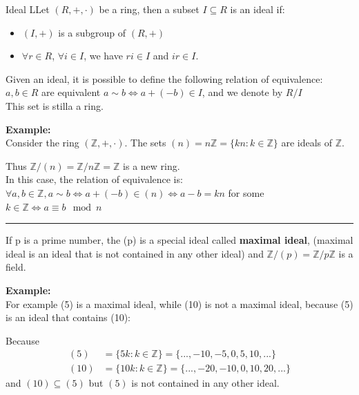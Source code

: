 \bigskip

\begin{defBox}{Ideal}
    LLet $(R, +, \cdot)$ be a ring, then a subset $I \subseteq R$ is an ideal if:
    \begin{itemize} 
        \item $(I, +)$ is a subgroup of $(R, +)$
        \item $\forall r \in R$, $\forall i \in I$, we have $ri \in I$ and $ir \in I$.
    \end{itemize}
\end{defBox}

\noindent
Given an ideal, it is possible to define the following relation of equivalence: $a, b \in R$ are equivalent $a \sim b \iff a + (-b) \in I$, and we denote by $R/I$\\
This set is stilla a ring.
\medskip

\noindent
\textbf{Example:}\\
Consider the ring $(\mathbb{Z}, +, \cdot)$. The sets $(n)= n\mathbb{Z} = \{ kn: k \in \mathbb{Z} \}$ are ideals of $\mathbb{Z}$.
\smallskip

\noindent
Thus $\mathbb{Z}/(n) = \mathbb{Z}/n\mathbb{Z} = \mathbb{Z}$ is a new ring.\\
In this case, the relation of equivalence is:\\
$\forall a, b \in \mathbb{Z}, a \sim b \iff a + (-b) \in (n) \iff a - b = kn $ for some $k \in \mathbb{Z} \iff a \equiv b \mod n$
\bigskip\\
\noindent\rule{\textwidth}{0.5pt}


\noindent
If p is a prime number, the (p) is a special ideal called \textbf{maximal ideal}, (maximal ideal is an ideal that is not contained in any other ideal) and $\mathbb{Z}/ (p) = \mathbb{Z}/ p\mathbb{Z}$ is a field.
\medskip

\noindent
\textbf{Example:}\\
For example (5) is a maximal ideal, while (10) is not a maximal ideal, because (5) is an ideal that contains (10):
\begin{center}
\end{center}
\noindent
Because
\begin{align*}
    (5) &= \{ 5k : k \in \mathbb{Z} \} = \{ ..., -10, -5, 0, 5, 10, ...\} \\
    (10) &= \{ 10k : k \in \mathbb{Z} \} = \{ ..., -20, -10, 0, 10, 20, ...\}
\end{align*}
\noindent
and $(10) \subseteq (5)$ but $(5)$ is not contained in any other ideal.

